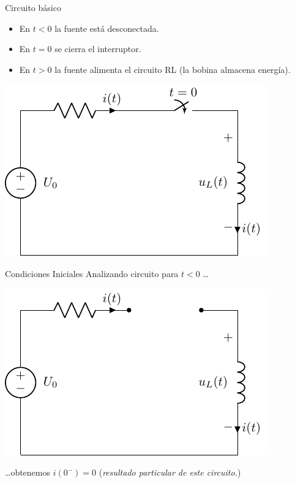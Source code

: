 \documentclass[aspectratio=169, usenames,svgnames,dvipsnames]{beamer}
\begin{document}
\begin{frame}[label={sec:org330700f}]{Circuito básico}
\begin{itemize}
\item En \(t < 0\) la fuente está desconectada.
\item En \(t = 0\) se cierra el interruptor.
\item En \(t > 0\) la fuente alimenta el circuito RL (la bobina almacena energía).
\end{itemize}

\begin{center}
\includegraphics[height=0.55\textheight]{../figs/transitorio_circuitoRL.pdf}
\end{center}
\end{frame}
\begin{frame}[label={sec:org58beae4}]{Condiciones Iniciales}
Analizando circuito para \(t < 0\) \ldots{}
\begin{center}
\includegraphics[height=0.45\textheight]{../figs/transitorio_circuitoRL_t0-.pdf}
\end{center}
\ldots{}obtenemos  \(i(0^-) = 0\) (\emph{resultado particular de este circuito.})
\end{frame}
\end{document}
